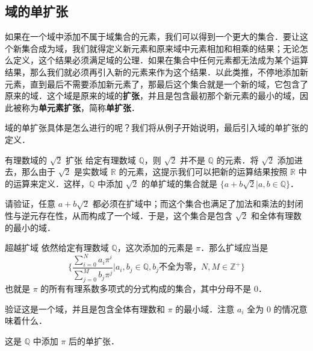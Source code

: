 

\subsection{域的单扩张}
如果在一个域中添加不属于域集合的元素，我们可以得到一个更大的集合．要让这个新集合成为域，我们就得定义新元素和原来域中元素相加和相乘的结果；无论怎么定义，这个结果必须满足域的公理．如果在集合中任何元素都无法成为某个运算结果，那么我们就必须再引入新的元素来作为这个结果．以此类推，不停地添加新元素，直到最后不需要添加新元素了，那最后这个集合就是一个新的域，它包含了原来的域．这个域是原来的域的\textbf{扩张}，并且是包含最初那个新元素的最小的域，因此被称为\textbf{单元素扩张}，简称\textbf{单扩张}．

域的单扩张具体是怎么进行的呢？我们将从例子开始说明，最后引入域的单扩张的定义．

\begin{exercise}{有理数域的 $\sqrt{2}$ 扩张}\label{FldExp_exe1}
给定有理数域 $\mathbb{Q}$，则 $\sqrt{2}$ 并不是 $\mathbb{Q}$ 的元素．将 $\sqrt{2}$ 添加进去，那么由于 $\sqrt{2}$ 是实数域 $\mathbb{R}$ 的元素，这提示我们可以把新的运算结果按照 $\mathbb{R}$ 中的运算来定义．这样，$\mathbb{Q}$ 中添加 $\sqrt{2}$ 的单扩域的集合就是 $\{a+b\sqrt{2}|a, b\in\mathbb{Q}\}$．

请验证，任意 $a+b\sqrt{2}$ 都必须在扩域中；而这个集合也满足了加法和乘法的封闭性与逆元存在性，从而构成了一个域．于是，这个集合是包含 $\sqrt{2}$ 和全体有理数的最小的域．
\end{exercise}

\begin{exercise}{超越扩域}\label{FldExp_exe2}
依然给定有理数域 $\mathbb{Q}$，这次添加的元素是 $\pi$．那么扩域应当是
\begin{equation}
\{\frac{\sum_{i=0}^N a_i\pi^i}{\sum_{j=0}^M b_j\pi^j}|a_i, b_j\in\mathbb{Q}, b_j\text{不全为零，} N, M\in\mathbb{Z}^+\}
\end{equation}
也就是 $\pi$ 的所有有理系数多项式的分式构成的集合，其中分母不是 $0$．

验证这是一个域，并且是包含全体有理数和 $\pi$ 的最小域．注意 $a_i$ 全为 $0$ 的情况意味着什么．

这是 $\mathbb{Q}$ 中添加 $\pi$ 后的单扩张．
\end{exercise}



